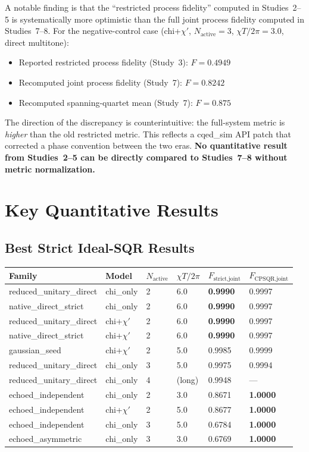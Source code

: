 \documentclass[11pt,letterpaper]{article}
\newcommand{\chiT}{\chi T / 2\pi}
\newcommand{\nact}{N_{\text{active}}}
\begin{document}
A notable finding is that the ``restricted process fidelity'' computed in Studies~2--5
is systematically more optimistic than the full joint process fidelity computed in
Studies~7--8.  For the negative-control case (chi+$\chi'$, $\nact = 3$, $\chiT = 3.0$,
direct multitone):
\begin{itemize}
\item Reported restricted process fidelity (Study~3): $F = 0.4949$
\item Recomputed joint process fidelity (Study~7): $F = 0.8242$
\item Recomputed spanning-quartet mean (Study~7): $F = 0.875$
\end{itemize}
The direction of the discrepancy is counterintuitive: the full-system metric
is \emph{higher} than the old restricted metric.  This reflects a cqed\_sim
API patch that corrected a phase convention between the two eras.
\textbf{No quantitative result from Studies~2--5 can be directly compared to
Studies~7--8 without metric normalization.}

\section{Key Quantitative Results}

\subsection{Best Strict Ideal-SQR Results}

\begin{center}
\begin{tabular}{llllll}
\toprule
Family & Model & $\nact$ & $\chiT$ & $F_\text{strict,joint}$ & $F_\text{CPSQR,joint}$ \\
\midrule
reduced\_unitary\_direct & chi\_only & 2 & 6.0 & \textbf{0.9990} & 0.9997 \\
native\_direct\_strict & chi\_only & 2 & 6.0 & \textbf{0.9990} & 0.9997 \\
reduced\_unitary\_direct & chi+$\chi'$ & 2 & 6.0 & \textbf{0.9990} & 0.9997 \\
native\_direct\_strict & chi+$\chi'$ & 2 & 6.0 & \textbf{0.9990} & 0.9997 \\
gaussian\_seed & chi+$\chi'$ & 2 & 5.0 & 0.9985 & 0.9999 \\
reduced\_unitary\_direct & chi\_only & 3 & 5.0 & 0.9975 & 0.9994 \\
reduced\_unitary\_direct & chi\_only & 4 & (long) & 0.9948 & --- \\
\midrule
echoed\_independent & chi\_only & 2 & 3.0 & 0.8671 & \textbf{1.0000} \\
echoed\_independent & chi+$\chi'$ & 2 & 5.0 & 0.8677 & \textbf{1.0000} \\
echoed\_independent & chi\_only & 3 & 5.0 & 0.6784 & \textbf{1.0000} \\
echoed\_asymmetric & chi\_only & 3 & 3.0 & 0.6769 & \textbf{1.0000} \\
\bottomrule
\end{tabular}
\end{center}
\end{document}
